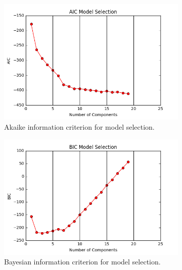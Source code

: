 \documentclass{article}
\begin{document}
\begin{figure}[H]
\begin{subfigure}[t]{0.45\textwidth}
\centering
\includegraphics[width=.99\textwidth]{../figs/aic_model.png}
\caption{Akaike information criterion for model selection.}
\label{fig:subim1}
\end{subfigure}\hfill
\begin{subfigure}[t]{0.45\textwidth}
\centering
\includegraphics[width=.99\textwidth]{../figs/bic_model.png}
\caption{Bayesian information criterion for model selection.}
\label{fig:subim2}
\end{subfigure}
\caption{}
\label{fig:image2}
\end{figure}

\end{document}

